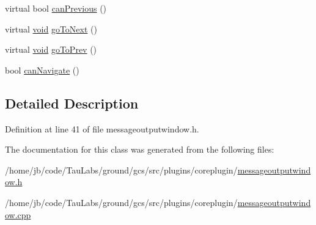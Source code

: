 \begin{DoxyCompactItemize}
\item 
virtual bool \hyperlink{group___core_plugin_gaf02af0f848762b44595d1048ead72618}{can\-Previous} ()
\item 
virtual \hyperlink{group___u_a_v_objects_plugin_ga444cf2ff3f0ecbe028adce838d373f5c}{void} \hyperlink{group___core_plugin_ga1d62cc55b88759eb3625e39f33247a9a}{go\-To\-Next} ()
\item 
virtual \hyperlink{group___u_a_v_objects_plugin_ga444cf2ff3f0ecbe028adce838d373f5c}{void} \hyperlink{group___core_plugin_ga69d15cbecd16198a1eb1d7a58f5eb2ff}{go\-To\-Prev} ()
\item 
bool \hyperlink{group___core_plugin_gaff4cb19c93407a117bd72ab89be06eab}{can\-Navigate} ()
\end{DoxyCompactItemize}


\subsection{\-Detailed \-Description}


\-Definition at line 41 of file messageoutputwindow.\-h.



\-The documentation for this class was generated from the following files\-:\begin{DoxyCompactItemize}
\item 
/home/jb/code/\-Tau\-Labs/ground/gcs/src/plugins/coreplugin/\hyperlink{messageoutputwindow_8h}{messageoutputwindow.\-h}\item 
/home/jb/code/\-Tau\-Labs/ground/gcs/src/plugins/coreplugin/\hyperlink{messageoutputwindow_8cpp}{messageoutputwindow.\-cpp}\end{DoxyCompactItemize}
